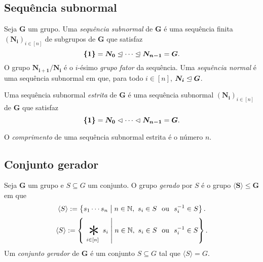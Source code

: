 \subsection{Sequência subnormal}

\begin{definition}
Seja $\bm G$ um grupo. Uma \emph{sequência subnormal} de $\bm G$ é uma sequência finita $(\bm{N_i})_{i \in [n]}$ de subgrupos de $\bm G$ que satisfaz
	\begin{equation*}
	\bm{\{1\}} = \bm{N_0} \mathrel{\unlhd} \cdots \mathrel{\unlhd} \bm{N_{n-1}} = \bm G.
	\end{equation*}
O grupo $\bm{N_{i+1}/N_i}$ é o $i$-ésimo \emph{grupo fator} da sequência.
Uma \emph{sequência normal} é uma sequência subnormal em que, para todo $i \in [n]$, $\bm{N_i} \mathrel{\unlhd} \bm G$.

Uma sequência subnormal \emph{estrita} de $\bm G$ é uma sequência subnormal $(\bm{N_i})_{i \in [n]}$ de $\bm G$ que satisfaz
	\begin{equation*}
	\bm{\{1\}} = \bm{N_0} \mathrel{\lhd} \cdots \mathrel{\lhd} \bm{N_{n-1}} = \bm G.
	\end{equation*}
	
O \emph{comprimento} de uma sequência subnormal estrita é o número $n$.
\end{definition}



\subsection{Conjunto gerador}

\begin{definition}
Seja $\bm G$ um grupo e $S \subseteq G$ um conjunto. O grupo \emph{gerado} por $S$ é o grupo $\bm{\langle S \rangle} \leq \bm G$ em que
	\begin{equation*}
	\langle S \rangle := \left\{{s_1 \cdots s_n}\;\middle\vert\;{n \in \mathbb{N},\ s_i \in S \text{\ \ ou\ \ } s_i^{-1} \in S}\right\}.
	\end{equation*}
	\begin{equation*}
	\langle S \rangle := \set{\bigopb_{i \in [n]} s_i}{n \in \N,\ s_i \in S \ou s_i\inv \in S}.
	\end{equation*}
\noindent
Um \emph{conjunto gerador} de $\bm G$ é um conjunto $S \subseteq G$ tal que $\langle S \rangle = G$.
\end{definition}










